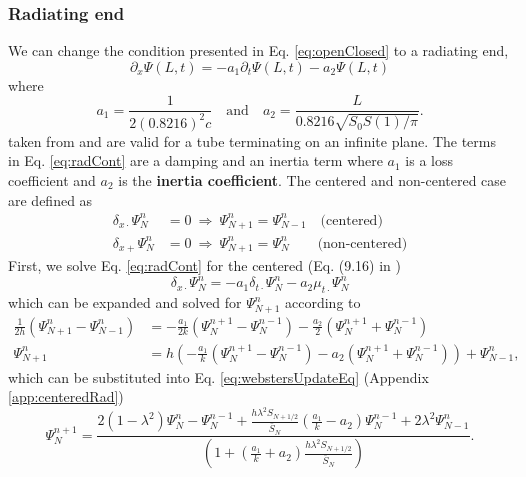 \documentclass[dvipsnames]{article}
\def\dtd{\delta_{t\cdot}}
\begin{document}
\subsubsection{Radiating end}\label{sec:radiating}
We can change the condition presented in Eq. \eqref{eq:openClosed} to a radiating end,
\begin{equation}\label{eq:radCont}
    \partial_x\Psi(L,t) = -a_1\partial_t\Psi(L,t)-a_2\Psi(L,t)
\end{equation}
where \cite{Bilbao2009}
\begin{equation}
    a_1 = \frac{1}{2(0.8216)^2c} \quad \text{and} \quad a_2 = \frac{L}{0.8216\sqrt{S_0S(1)/\pi}}.
\end{equation}
taken from \cite{Atig2004} and are valid for a tube terminating on an infinite plane. The terms in Eq. \eqref{eq:radCont} are a damping and an inertia term where $a_1$ is a loss coefficient and $a_2$ is the \textbf{inertia coefficient}. The centered and non-centered case are defined as
\begin{equation}\label{eq:rightBoundaryConditions}
\begin{split}
    \delta_{x\cdot}\Psi_N^n &= 0 \ \Rightarrow \ \Psi_{N+1}^n = \Psi_{N-1}^n \quad \text{(centered)}\\
    \delta_{x+}\Psi_N^n &= 0\  \Rightarrow \ \Psi_{N+1}^n = \Psi_N^n\qquad \text{(non-centered)}
\end{split}
\end{equation}
First, we solve Eq. \eqref{eq:radCont} for the centered (Eq. (9.16) in \cite{Bilbao2009})
\begin{equation}\label{eq:centRadBound}
    \delta_{x\cdot}\Psi_N^n = -a_1\dtd\Psi_N^n - a_2\mu_{t\cdot}\Psi_N^n
\end{equation}
which can be expanded and solved for $\Psi_{N+1}^n$ according to
\begin{align}
    \frac{1}{2h}(\Psi_{N+1}^n - \Psi_{N-1}^n) &= -\frac{a_1}{2k}(\Psi_N^{n+1} - \Psi_N^{n-1}) - \frac{a_2}{2}(\Psi_N^{n+1} + \Psi_N^{n-1})\nonumber\\
    \Psi_{N+1}^n &= h\left(-\frac{a_1}{k}(\Psi_N^{n+1} - \Psi_N^{n-1}) - a_2(\Psi_N^{n+1} + \Psi_N^{n-1})\right) + \Psi_{N-1}^n,
\end{align}
which can be substituted into Eq. \eqref{eq:webstersUpdateEq} (Appendix \ref{app:centeredRad}) 
\begin{equation}
    \Psi_N^{n+1} = \frac{2(1-\lambda^2)\Psi_N^n-\Psi_N^{n-1}+\frac{h\lambda^2S_{N+1/2}}{\bar S_N}\left(\frac{a_1}{k}-a_2\right)\Psi_N^{n-1} + 2\lambda^2\Psi_{N-1}^n}{\left(1+\left(\frac{a_1}{k}+a_2\right)\frac{h\lambda^2S_{N+1/2}}{\bar S_N}\right)}.
\end{equation}
\end{document}
